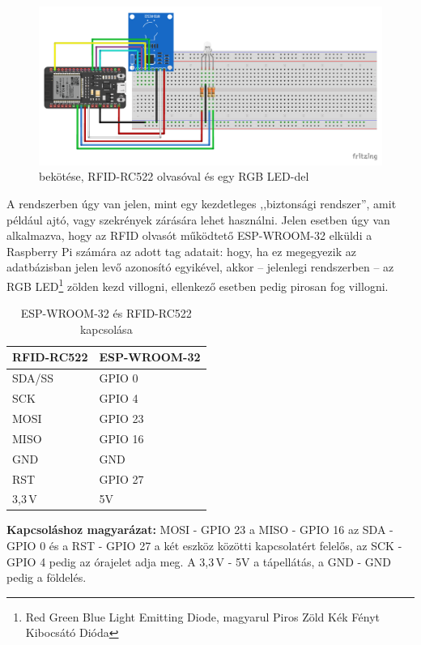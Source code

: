 \documentclass[
]{thesis-ekf}
\theoremstyle{definition}
\theoremstyle{remark}
\begin{document}
	\begin{figure}[ht!]
		\centering
		\includegraphics[width=1\textwidth]{./src/schematics/RFID reader schematics_bb}
		\caption{ bekötése, RFID-RC522 olvasóval és egy RGB LED-del}
		\label{rfid-schematics}
	\end{figure}	

	A rendszerben úgy van jelen, mint egy kezdetleges ,,biztonsági rendszer'', amit például ajtó, vagy szekrények zárására lehet használni. Jelen esetben úgy van alkalmazva, hogy az RFID olvasót működtető ESP-WROOM-32 elküldi a Raspberry Pi számára az adott tag adatait: hogy, ha ez megegyezik az adatbázisban jelen levő azonosító egyikével, akkor -- jelenlegi rendszerben -- az RGB LED\footnote{\label{rgb-led}Red Green Blue Light Emitting Diode, magyarul Piros Zöld Kék Fényt Kibocsátó Dióda} zölden kezd villogni, ellenkező esetben pedig pirosan fog villogni.

	\begin{table}[ht!]
		\centering
		\begin{tabular}{|l|l|}
			\hline
			\textbf{RFID-RC522} &  \textbf{ESP-WROOM-32} \\ \hline
			SDA/SS & GPIO 0 \\ \hline
			SCK  & GPIO 4 \\ \hline
			MOSI & GPIO 23 \\ \hline
			MISO & GPIO 16 \\ \hline
			GND & GND \\ \hline
			RST & GPIO 27 \\ \hline
			3,3\,V & 5V  \\ \hline
		\end{tabular}
		\caption{ESP-WROOM-32 és RFID-RC522 kapcsolása}
		\label{rfid-connection-table}
	\end{table}

	\textbf{Kapcsoláshoz magyarázat:}
	MOSI - GPIO 23 a MISO - GPIO 16 az SDA - GPIO 0 és a RST - GPIO 27 a két eszköz közötti kapcsolatért felelős, az SCK - GPIO 4 pedig az órajelet adja meg. A 3,3\,V - 5V a tápellátás, a GND - GND pedig a földelés.
	
\end{document}
